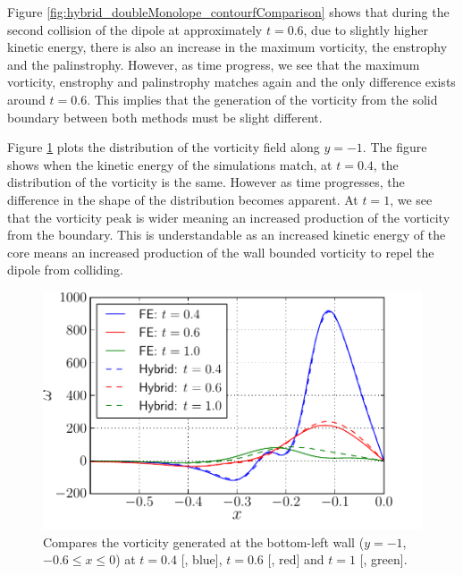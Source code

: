 
Figure  \ref{fig:hybrid_doubleMonolope_contourfComparison} shows that during the second collision of the dipole at approximately $t=0.6$, due to slightly higher kinetic energy, there is also an increase in the maximum vorticity, the enstrophy and the palinstrophy. However, as time progress, we see that the maximum vorticity, enstrophy and palinstrophy matches again and the only difference exists around $t=0.6$. This implies that the generation of the vorticity from the solid boundary between both methods must be slight different.

Figure \ref{fig:hybrid_doubleMonopole_vorticityAtBoundary} plots the distribution of the vorticity field along $y=-1$. The figure shows when the kinetic energy of the simulations match, at $t=0.4$, the distribution of the vorticity is the same. However as time progresses, the difference in the shape of the distribution becomes apparent. At $t=1$, we see that the vorticity peak is wider meaning an increased production of the vorticity from the boundary. This is understandable as an increased kinetic energy of the core means an increased production of the wall bounded vorticity to repel the dipole from colliding.




	\begin{figure}[!t]
	\centering
	\includegraphics[width=0.5\linewidth]{./figures/validation/cbColl/hybrid_doubleMonopole_vorticityAtBoundary.pdf}
	\caption{Compares the vorticity generated at the bottom-left wall ($y=-1$, $-0.6\leqslant x \leqslant 0$) at $t=0.4$ [{\color{plotBlue}{---}}, blue], $t=0.6$ [{\color{plotRed}{---}}, red] and $t=1$ [{\color{plotGreen}{---}}, green].}
	\label{fig:hybrid_doubleMonopole_vorticityAtBoundary}
	\end{figure}

